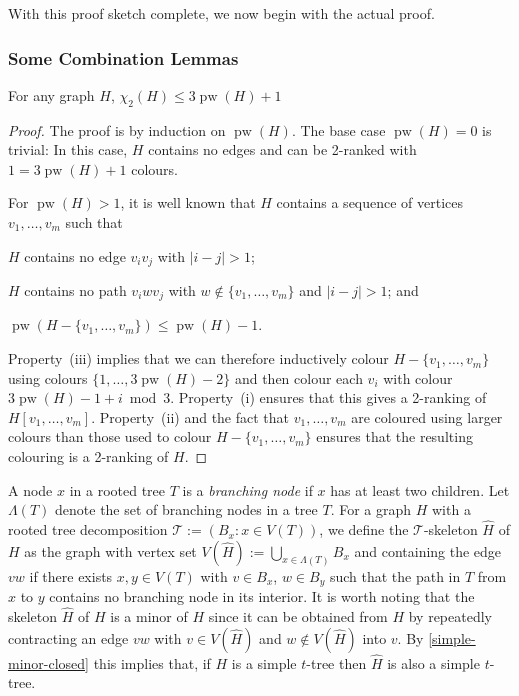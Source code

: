 \documentclass[kpfonts]{patmorin}
\DeclareMathOperator{\pw}{pw}
\newcommand{\trn}{\chi_2}
\theoremstyle{named}
\begin{document}
With this proof sketch complete, we now begin with the actual proof.

\subsubsection{Some Combination Lemmas}

\begin{lem}\label{pathwidth}
    For any graph $H$, $\trn(H)\le 3\pw(H) + 1$
\end{lem}

\begin{proof}
    The proof is by induction on $\pw(H)$.  The base case $\pw(H)=0$ is trivial: In this case, $H$ contains no edges and can be 2-ranked with $1 = 3\pw(H)+1$ colours.

    For $\pw(H)>1$, it is well known that $H$ contains a sequence of vertices $v_1,\ldots,v_m$  such that
    \begin{inparaenum}[(i)]
        \item $H$ contains no edge $v_iv_j$ with $|i-j|>1$;
        \item $H$ contains no path $v_iw v_j$ with $w\not\in\{v_1,\ldots,v_m\}$ and $|i-j|>1$; and
        \item $\pw(H-\{v_1,\ldots,v_m\})\le \pw(H)-1$.
    \end{inparaenum}
    Property~(iii) implies that we can therefore inductively colour $H-\{v_1,\ldots,v_m\}$ using colours $\{1,\ldots,3\pw(H)-2\}$ and then colour each $v_i$ with colour $3\pw(H)-1+i\bmod 3$.  Property~(i) ensures that this gives a 2-ranking of $H[v_1,\ldots,v_m]$.  Property~(ii) and the fact that $v_1,\ldots,v_m$ are coloured using larger colours than those used to colour $H-\{v_1,\ldots,v_m\}$ ensures that the resulting colouring is a 2-ranking of $H$.
\end{proof}

A node $x$ in a rooted tree $T$ is a \emph{branching node} if $x$ has at least two children.  Let $\Lambda(T)$ denote the set of branching nodes in a tree $T$. For a graph $H$ with a rooted tree decomposition $\mathcal{T}:=(B_x:x\in V(T))$, we define the $\mathcal{T}$-skeleton $\hat{H}$ of $H$ as the graph with vertex set $V(\hat{H}):=\bigcup_{x\in \Lambda(T)} B_x$ and containing the edge $vw$ if there exists $x,y\in V(T)$ with $v\in B_x$, $w\in B_y$ such that the path in $T$ from $x$ to $y$ contains no branching node in its interior.  It is worth noting that the skeleton $\hat{H}$ of $H$ is a minor of $H$ since it can be obtained from $H$ by repeatedly contracting an edge $vw$ with $v\in V(\hat{H})$ and $w\not\in V(\hat{H})$ into $v$. By \cref{simple-minor-closed} this implies that, if $H$ is a simple $t$-tree then $\hat{H}$ is also a simple $t$-tree.
\end{document}
